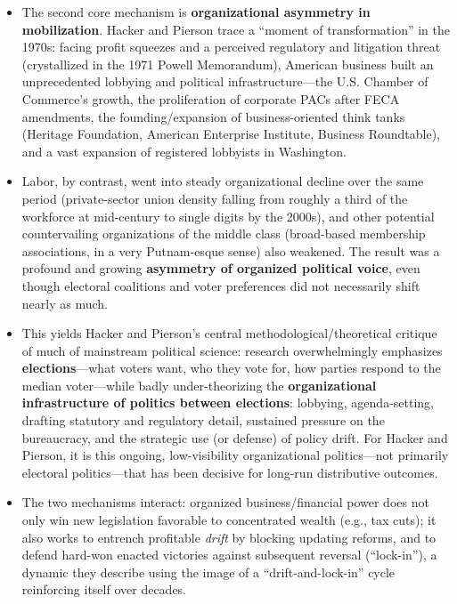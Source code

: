 \documentclass[12pt]{article}
\begin{document}
\begin{itemize}[leftmargin=*, itemsep=4pt]
    \item The second core mechanism is \textbf{organizational asymmetry in mobilization}. Hacker and Pierson trace a ``moment of transformation'' in the 1970s: facing profit squeezes and a perceived regulatory and litigation threat (crystallized in the 1971 Powell Memorandum), American business built an unprecedented lobbying and political infrastructure---the U.S. Chamber of Commerce's growth, the proliferation of corporate PACs after FECA amendments, the founding/expansion of business-oriented think tanks (Heritage Foundation, American Enterprise Institute, Business Roundtable), and a vast expansion of registered lobbyists in Washington.
    \item Labor, by contrast, went into steady organizational decline over the same period (private-sector union density falling from roughly a third of the workforce at mid-century to single digits by the 2000s), and other potential countervailing organizations of the middle class (broad-based membership associations, in a very Putnam-esque sense) also weakened. The result was a profound and growing \textbf{asymmetry of organized political voice}, even though electoral coalitions and voter preferences did not necessarily shift nearly as much.
    \item This yields Hacker and Pierson's central methodological/theoretical critique of much of mainstream political science: research overwhelmingly emphasizes \textbf{elections}---what voters want, who they vote for, how parties respond to the median voter---while badly under-theorizing the \textbf{organizational infrastructure of politics between elections}: lobbying, agenda-setting, drafting statutory and regulatory detail, sustained pressure on the bureaucracy, and the strategic use (or defense) of policy drift. For Hacker and Pierson, it is this ongoing, low-visibility organizational politics---not primarily electoral politics---that has been decisive for long-run distributive outcomes.
    \item The two mechanisms interact: organized business/financial power does not only win new legislation favorable to concentrated wealth (e.g., tax cuts); it also works to entrench profitable \emph{drift} by blocking updating reforms, and to defend hard-won enacted victories against subsequent reversal (``lock-in''), a dynamic they describe using the image of a ``drift-and-lock-in'' cycle reinforcing itself over decades.
\end{itemize}

\end{document}
